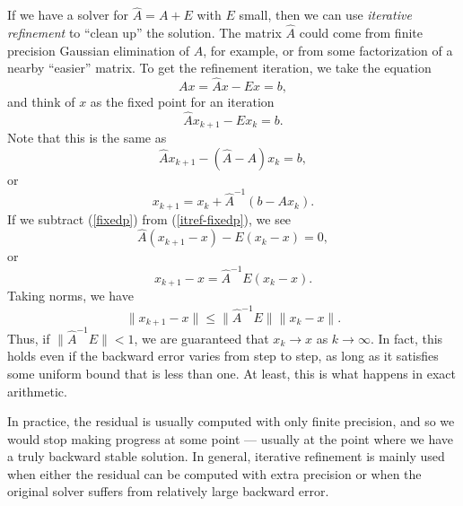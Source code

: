 \documentclass[12pt, leqno]{article} %
\begin{document}
If we have a solver for $\hat{A} = A + E$ with $E$ small, then we can
use {\em iterative refinement} to ``clean up'' the solution.  The
matrix $\hat{A}$ could come from finite precision Gaussian elimination
of $A$, for example, or from some factorization of a nearby ``easier''
matrix.  To get the refinement iteration, we take the equation
\begin{equation} \label{fixedp}
  Ax = \hat{A}x-Ex = b,
\end{equation}
and think of $x$ as the fixed point for an iteration
\begin{equation} \label{itref-fixedp}
  \hat{A} x_{k+1} - E x_k = b.
\end{equation}
Note that this is the same as
\[
  \hat{A} x_{k+1} - (\hat{A} - A) x_k = b,
\]
or
\[
  x_{k+1} = x_k + \hat{A}^{-1} (b - A x_{k}).
\]
If we subtract (\ref{fixedp}) from (\ref{itref-fixedp}), we see
\[
  \hat{A}(x_{k+1}-x) - E(x_k-x) = 0,
\]
or
\[
  x_{k+1}-x = \hat{A}^{-1} E (x_k-x).
\]
Taking norms, we have
\[
  \|x_{k+1}-x\| \leq \|\hat{A}^{-1} E\| \|x_k-x\|.
\]
Thus, if $\|\hat{A}^{-1} E\| < 1$, we are guaranteed that $x_{k} \rightarrow x$
as $k \rightarrow \infty$.  In fact, this holds even if the backward error
varies from step to step, as long as it satisfies some uniform bound that is
less than one.  At least, this is what happens in exact arithmetic.

In practice, the residual is usually computed with only finite precision,
and so we would stop making progress at some point --- usually at
the point where we have a truly backward stable solution.  In general,
iterative refinement is mainly used when either the residual can be
computed with extra precision or when the original solver suffers from
relatively large backward error.
\end{document}
